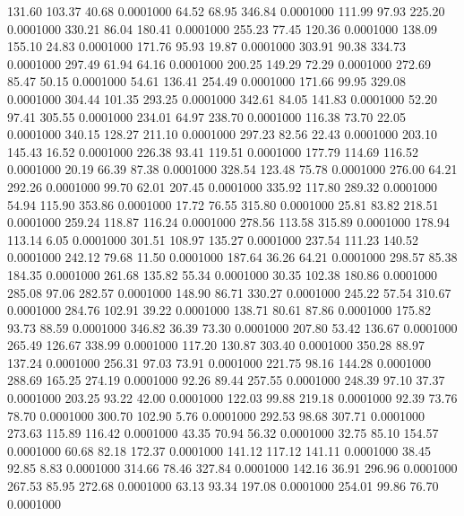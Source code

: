  131.60  103.37   40.68   0.0001000
  64.52   68.95  346.84   0.0001000
 111.99   97.93  225.20   0.0001000
 330.21   86.04  180.41   0.0001000
 255.23   77.45  120.36   0.0001000
 138.09  155.10   24.83   0.0001000
 171.76   95.93   19.87   0.0001000
 303.91   90.38  334.73   0.0001000
 297.49   61.94   64.16   0.0001000
 200.25  149.29   72.29   0.0001000
 272.69   85.47   50.15   0.0001000
  54.61  136.41  254.49   0.0001000
 171.66   99.95  329.08   0.0001000
 304.44  101.35  293.25   0.0001000
 342.61   84.05  141.83   0.0001000
  52.20   97.41  305.55   0.0001000
 234.01   64.97  238.70   0.0001000
 116.38   73.70   22.05   0.0001000
 340.15  128.27  211.10   0.0001000
 297.23   82.56   22.43   0.0001000
 203.10  145.43   16.52   0.0001000
 226.38   93.41  119.51   0.0001000
 177.79  114.69  116.52   0.0001000
  20.19   66.39   87.38   0.0001000
 328.54  123.48   75.78   0.0001000
 276.00   64.21  292.26   0.0001000
  99.70   62.01  207.45   0.0001000
 335.92  117.80  289.32   0.0001000
  54.94  115.90  353.86   0.0001000
  17.72   76.55  315.80   0.0001000
  25.81   83.82  218.51   0.0001000
 259.24  118.87  116.24   0.0001000
 278.56  113.58  315.89   0.0001000
 178.94  113.14    6.05   0.0001000
 301.51  108.97  135.27   0.0001000
 237.54  111.23  140.52   0.0001000
 242.12   79.68   11.50   0.0001000
 187.64   36.26   64.21   0.0001000
 298.57   85.38  184.35   0.0001000
 261.68  135.82   55.34   0.0001000
  30.35  102.38  180.86   0.0001000
 285.08   97.06  282.57   0.0001000
 148.90   86.71  330.27   0.0001000
 245.22   57.54  310.67   0.0001000
 284.76  102.91   39.22   0.0001000
 138.71   80.61   87.86   0.0001000
 175.82   93.73   88.59   0.0001000
 346.82   36.39   73.30   0.0001000
 207.80   53.42  136.67   0.0001000
 265.49  126.67  338.99   0.0001000
 117.20  130.87  303.40   0.0001000
 350.28   88.97  137.24   0.0001000
 256.31   97.03   73.91   0.0001000
 221.75   98.16  144.28   0.0001000
 288.69  165.25  274.19   0.0001000
  92.26   89.44  257.55   0.0001000
 248.39   97.10   37.37   0.0001000
 203.25   93.22   42.00   0.0001000
 122.03   99.88  219.18   0.0001000
  92.39   73.76   78.70   0.0001000
 300.70  102.90    5.76   0.0001000
 292.53   98.68  307.71   0.0001000
 273.63  115.89  116.42   0.0001000
  43.35   70.94   56.32   0.0001000
  32.75   85.10  154.57   0.0001000
  60.68   82.18  172.37   0.0001000
 141.12  117.12  141.11   0.0001000
  38.45   92.85    8.83   0.0001000
 314.66   78.46  327.84   0.0001000
 142.16   36.91  296.96   0.0001000
 267.53   85.95  272.68   0.0001000
  63.13   93.34  197.08   0.0001000
 254.01   99.86   76.70   0.0001000

